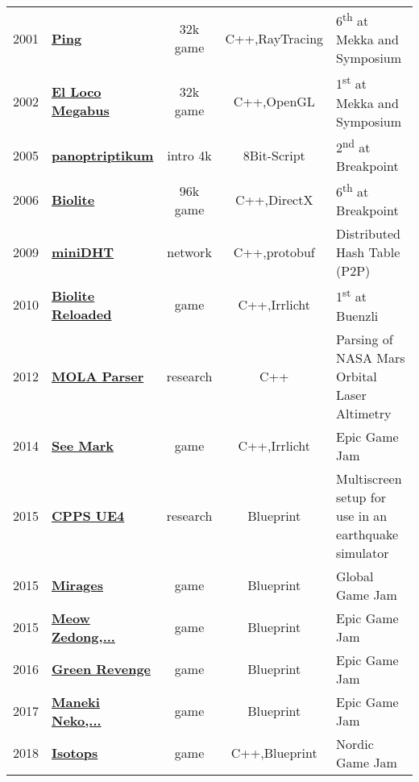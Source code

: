 \documentclass[a4paper]{deedy-resume} %
\begin{document}
\begin{tabular}{rlccl}
2001 & \textbf{\href{http://www.pouet.net/prod.php?which=5691}{Ping}} &
	32k game & C++,RayTracing & 6\textsuperscript{th} at Mekka and Symposium \\
2002 & \textbf{\href{http://www.pouet.net/prod.php?which=5652}{El Loco Megabus}} &
	32k game & C++,OpenGL & 1\textsuperscript{st} at Mekka and Symposium \\
2005 & \textbf{\href{http://www.pouet.net/prod.php?which=16393}{panoptriptikum}} &
	intro 4k & 8Bit-Script & 2\textsuperscript{nd} at Breakpoint \\
2006 & \textbf{\href{http://www.pouet.net/prod.php?which=24578}{Biolite}} &
	96k game & C++,DirectX & 6\textsuperscript{th} at Breakpoint \\
2009 & \textbf{\href{https://github.com/anirul/miniDHT}{miniDHT}} &
	network & C++,protobuf & Distributed Hash Table (P2P) \\
2010 & \textbf{\href{http://www.pouet.net/prod.php?which=55711}{Biolite Reloaded}} &
	game & C++,Irrlicht & 1\textsuperscript{st} at Buenzli \\
2012 & \textbf{\href{https://github.com/anirul/MOLA\_parser}{MOLA Parser}} &
	research & C++ & Parsing of NASA Mars Orbital Laser Altimetry \\
2014 & \textbf{\href{https://www.epicgamejam.com/games/sea-mark}{See Mark}} &
	game & C++,Irrlicht & Epic Game Jam \\
2015 & \textbf{\href{https://github.com/anirul/CppsTest}{CPPS UE4}} &
	research & Blueprint & Multiscreen setup for use in an earthquake simulator \\
2015 & \textbf{\href{https://globalgamejam.org/2015/games/mirages}{Mirages}} &
	game & Blueprint & Global Game Jam \\
2015 & \textbf{\href{https://www.epicgamejam.com/games/meow-zedong-great-helmsman-future-chairman-urinal-leap-forward}{Meow Zedong,...}} &
	game & Blueprint & Epic Game Jam \\
2016 & \textbf{\href{https://www.epicgamejam.com/games/greens-revenge}{Green Revenge}} &
	game & Blueprint & Epic Game Jam \\
2017 & \textbf{\href{https://www.epicgamejam.com/games/meow-zedongs-battle-royale-maneki-neko-wool-party-ocean-deathmatch}{Maneki Neko,...}} &
	game & Blueprint & Epic Game Jam \\
2018 & \textbf{\href{https://anirul.itch.io/isotops}{Isotops}} &
	game & C++,Blueprint & Nordic Game Jam \\

\end{tabular}
\end{document}
